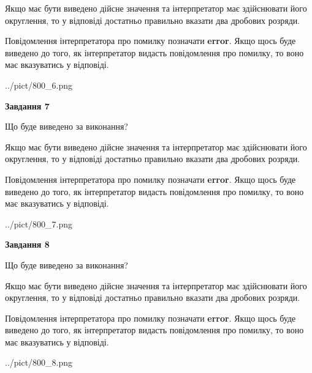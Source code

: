 \documentclass[12pt, ukrainian]{article}
\begin{document}
{\begin {Large}
Якщо має бути виведено дійсне значення та інтерпретатор має здійснювати його округлення, 
то у відповіді достатньо правильно вказати два дробових розряди.

Повідомлення інтерпретатора про помилку позначати \textbf{error}.
Якщо щось буде виведено до того, як інтерпретатор видасть повідомлення про помилку, 
то воно має вказуватись у відповіді. \par

\begin{center}
	{../pict/800_6.png}
\end{center}
\newpage

{\begin {center}\textbf{Завдання 7}\end {center}}\par
Що буде виведено за виконання? \par

Якщо має бути виведено дійсне значення та інтерпретатор має здійснювати його округлення, 
то у відповіді достатньо правильно вказати два дробових розряди.

Повідомлення інтерпретатора про помилку позначати \textbf{error}.
Якщо щось буде виведено до того, як інтерпретатор видасть повідомлення про помилку, 
то воно має вказуватись у відповіді. \par

\begin{center}
	{../pict/800_7.png}
\end{center}
\newpage

{\begin {center}\textbf{Завдання 8}\end {center}}\par
Що буде виведено за виконання? \par

Якщо має бути виведено дійсне значення та інтерпретатор має здійснювати його округлення, 
то у відповіді достатньо правильно вказати два дробових розряди.

Повідомлення інтерпретатора про помилку позначати \textbf{error}.
Якщо щось буде виведено до того, як інтерпретатор видасть повідомлення про помилку, 
то воно має вказуватись у відповіді. \par

\begin{center}
	{../pict/800_8.png}
\end{center}
\newpage


\end{Large}}
\end{document}
